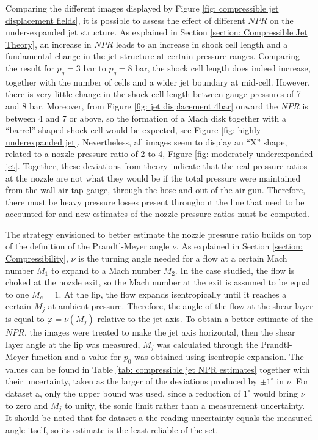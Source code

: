 Comparing the different images displayed by Figure \ref{fig: compressible jet displacement fields}, it is possible to assess the effect of different $NPR$ on the under-expanded jet structure. As explained in Section \ref{section: Compressible Jet Theory}, an increase in $NPR$ leads to an increase in shock cell length and a fundamental change in the jet structure at certain pressure ranges. Comparing the result for $p_g = 3$ bar to $p_g = 8$ bar, the shock cell length does indeed increase, together with the number of cells and a wider jet boundary at mid-cell. However, there is very little change in the shock cell length between gauge pressures of 7 and 8 bar. Moreover, from Figure \ref{fig: jet displacement 4bar} onward the $NPR$ is between 4 and 7 or above, so the formation of a Mach disk together with a ``barrel'' shaped shock cell would be expected, see Figure \ref{fig: highly underexpanded jet}. Nevertheless, all images seem to display an ``X'' shape, related to a nozzle pressure ratio of 2 to 4, Figure \ref{fig: moderately underexpanded jet}. Together, these deviations from theory indicate that the real pressure ratios at the nozzle are not what they would be if the total pressure were maintained from the wall air tap gauge, through the hose and out of the air gun. Therefore, there must be heavy pressure losses present throughout the line that need to be accounted for and new estimates of the nozzle pressure ratios must be computed.

The strategy envisioned to better estimate the nozzle pressure ratio builds on top of the definition of the Prandtl-Meyer angle $\nu$. As explained in Section \ref{section: Compressibility}, $\nu$ is the turning angle needed for a flow at a certain Mach number $M_1$ to expand to a Mach number $M_2$. In the case studied, the flow is choked at the nozzle exit, so the Mach number at the exit is assumed to be equal to one $M_e = 1$. At the lip, the flow expands isentropically until it reaches a certain $M_j$ at ambient pressure. Therefore, the angle of the flow at the shear layer is equal to $\varphi = \nu(M_j)$ relative to the jet axis. To obtain a better estimate of the $NPR$, the images were treated to make the jet axis horizontal, then the shear layer angle at the lip was measured, $M_j$ was calculated through the Prandtl-Meyer function and a value for $p_0$ was obtained using isentropic expansion. The values can be found in Table \ref{tab: compressible jet NPR estimates} together with their uncertainty, taken as the larger of the deviations produced by $\pm 1^\circ$ in $\nu$. For dataset a, only the upper bound was used, since a reduction of $1^\circ$ would bring $\nu$ to zero and $M_j$ to unity, the sonic limit rather than a measurement uncertainty. It should be noted that for dataset a the reading uncertainty equals the measured angle itself, so its estimate is the least reliable of the set.


